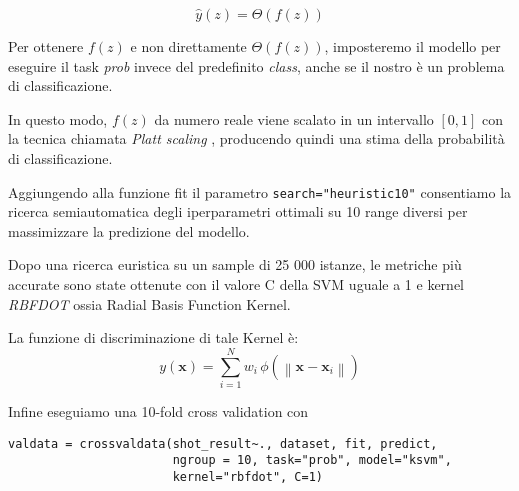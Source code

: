 $$\hat{y}(z) = \Theta(f(z))$$

Per ottenere $f(z)$ e non direttamente $\Theta(f(z))$, imposteremo il modello per eseguire il task \textit{prob} invece del predefinito \textit{class}, anche se il nostro è un problema di classificazione.

In questo modo, $f(z)$ da numero reale viene scalato in un intervallo $[0, 1]$ con la tecnica chiamata \textit{Platt scaling} \cite{Platt99probabilisticoutputs}, producendo quindi una stima della probabilità di classificazione.
\par
Aggiungendo alla funzione fit il parametro \texttt{search="heuristic10"} consentiamo la ricerca semiautomatica degli iperparametri ottimali su 10 range diversi per massimizzare la predizione del modello.
\par
Dopo una ricerca euristica su un sample di 25 000 istanze, le metriche più accurate sono state ottenute con il valore C della SVM uguale a 1 e kernel \textit{RBFDOT} ossia Radial Basis Function Kernel.
\par
La funzione di discriminazione di tale Kernel è:
\begin{equation}
y\left(\mathbf{x}\right) = \sum_{i=1}^N w_i \, \phi\left(\left\|\mathbf{x} - \mathbf{x}_i\right\|\right)\label{RBFK}
\end{equation}

Infine eseguiamo una 10-fold cross validation con

\begin{verbatim}
valdata = crossvaldata(shot_result~., dataset, fit, predict,
                       ngroup = 10, task="prob", model="ksvm",
                       kernel="rbfdot", C=1)
\end{verbatim}
